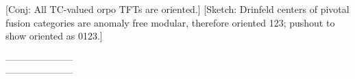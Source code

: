 \documentclass{amsart}
\begin{document}
	[Conj: All TC-valued orpo TFTs are oriented.] [Sketch: Drinfeld centers of pivotal fusion categories are anomaly free modular, therefore oriented 123; pushout to show oriented as 0123.]



\nid ---------------------\\
---------------------




\end{document}
